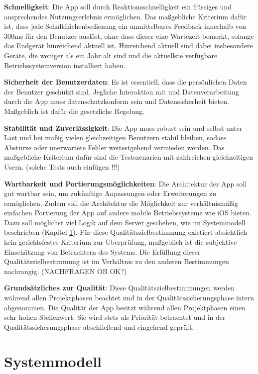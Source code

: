 \documentclass[oneside, ngerman]{sdqtechreport}
\begin{document}
\textbf{Schnelligkeit}: Die App soll durch Reaktionsschnelligkeit ein flüssiges und ansprechendes Nutzungserlebnis ermöglichen. Das maßgebliche Kriterium dafür ist, dass jede Schaltflächenbedienung ein unmittelbares Feedback innerhalb von 300ms für den Benutzer auslöst, ohne dass dieser eine Wartezeit bemerkt, solange das Endgerät hinreichend aktuell ist. Hinreichend aktuell sind dabei insbesondere Geräte, die weniger als ein Jahr alt sind und die aktuellste verfügbare Betriebssystemversion installiert haben.

\textbf{Sicherheit der Benutzerdaten}: Es ist essentiell, dass die persönlichen Daten der Benutzer geschützt sind. Jegliche Interaktion mit und Datenverarbeitung durch die App muss datenschutzkonform sein und Datensicherheit bieten. Maßgeblich ist dafür die gesetzliche Regelung.

\textbf{Stabilität und Zuverlässigkeit}: Die App muss robust sein und selbst unter Last und bei mäßig vielen gleichzeitigen Benutzern stabil bleiben, sodass Abstürze oder unerwartete Fehler weitestgehend vermieden werden. Das maßgebliche Kriterium dafür sind die Testszenarien mit zahlreichen gleichzeitigen Usern. (solche Tests auch einfügen !!!)

\textbf{Wartbarkeit und Portierungsmöglichkeiten}: Die Architektur der App soll gut wartbar sein, um zukünftige Anpassungen oder Erweiterungen zu ermöglichen. Zudem soll die Architektur die Möglichkeit zur verhältnismäßig einfachen Portierung der App auf andere mobile Betriebssysteme wie iOS bieten. Dazu soll möglichst viel Logik auf dem Server geschehen, wie im Systemmodell beschrieben (Kapitel \ref{chap:Systemmodell}). Für diese Qualitätszielbestimmung existiert absichtlich kein gerichtsfestes Kriterium zur Überprüfung, maßgeblich ist die subjektive Einschätzung von Betrachtern des Systems. Die Erfüllung dieser Qualitätszielbestimmung ist im Verhältnis zu den anderen Bestimmungen nachrangig. (NACHFRAGEN OB OK?)

\textbf{Grundsätzliches zur Qualität}: Diese Qualitätszielbestimmungen werden während allen Projektphasen beachtet und in der Qualitätssicherungsphase intern abgenommen. Die Qualität der App besitzt während allen Projektphasen einen sehr hohen Stellenwert: Sie wird stets als Priorität betrachtet und in der Qualitätssicherungsphase abschließend und eingehend geprüft.


\chapter{Systemmodell}
\label{chap:Systemmodell}
\end{document}
